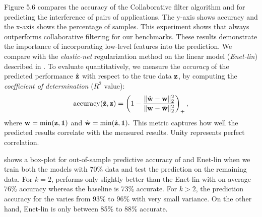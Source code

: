  Figure 5.6 compares the accuracy of the
Collaborative filter algorithm and \SYSTEM{} for predicting the interference of
pairs of applications.  The y-axis shows accuracy and the x-axis shows
the percentage of samples.  This experiment shows that \SYSTEM{}
always outperforms collaborative filtering for our benchmarks.  These
results demonstrate the importance of incorporating low-level features
into the prediction.
We compare \SYSTEM{} with the \textit{elastic-net} regularization
method on the linear model (\textit{Enet-lin}) described in
.   To evaluate
quantitatively, we measure the \emph{accuracy} of the predicted
performance $\hat{\mathbf{z}}$ with respect to the true data $\mathbf{z}$, by
computing the \emph{coefficient of determination} ($R^2$ value):
\begin{equation}
\label{eq:accuracy}
\text{accuracy}(\hat{\mathbf{z}},\mathbf{z}) = \left(1 - \frac{\| \hat{\mathbf{w}}-\mathbf{w} \|^2_2}{\| \mathbf{w} - \bar{\mathbf{w}}\|^2_2}\right)_{+},
\end{equation}
where $\mathbf{w} = \min(\mathbf{z},\boldsymbol{1})$ and $\hat{\mathbf{w}} =
\min(\hat{\mathbf{z}},\boldsymbol{1}).$ This metric captures how well the
predicted results correlate with the measured results. Unity
represents perfect correlation.



 shows a box-plot for out-of-sample
predictive accuracy of \SYSTEM{} and Enet-lin when we train both the
models with 70\% data and test the prediction on the remaining data.
For $k=2$, \SYSTEM{} performs only slightly better than the Enet-lin
with on average 76\% accuracy whereas the baseline is 73\% accurate.
For $k>2$, the prediction accuracy for the \SYSTEM{} varies from 93\%
to 96\% with very small variance. On the other hand, Enet-lin is only
between 85\% to 88\% accurate.

